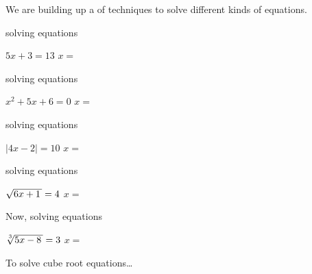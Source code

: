 \vfill 
We are building up a  of techniques to solve different kinds of equations.
\vspace{1\onelineskip}

\begin{tcbraster}[
    raster equal height, 
    raster columns = 2,
    raster column skip = 0.5in,
]
    \begin{tcolorbox}[colback=white,boxrule=0.5pt,]
        \raggedright
        {\small solving  equations \phantom{xxxxxxx}}
        \begin{center}
            \small
            $5x +3 = 13$
            \quad{\large$\Rightarrow$}\quad
            $x =$ 
        \end{center}
    \end{tcolorbox}
    \begin{tcolorbox}[colback=white,boxrule=0.5pt,]
        \raggedright
        {\small solving  equations}
        \begin{center}
            \small
            $x^2 + 5x + 6 = 0$
            \quad{\large$\Rightarrow$}\quad
            $x =$ 
        \end{center}
    \end{tcolorbox}
    \begin{tcolorbox}[colback=white,boxrule=0.5pt,]
        \raggedright
        {\small solving  equations}
        \begin{center}
            \small
            $|4x -2 | = 10$
            \quad{\large$\Rightarrow$}\quad
            $x =$ 
        \end{center}
    \end{tcolorbox}
    \begin{tcolorbox}[colback=white,boxrule=0.5pt,]
        \raggedright
        {\small solving  equations}
        \begin{center}
            \small
            $\myRoot{6x+1} = 4$
            \quad{\large$\Rightarrow$}\quad
            $x =$ 
        \end{center}
    \end{tcolorbox}
\end{tcbraster}

\begin{tcolorbox}[center,width=3.5in,colback=white,boxrule=0.5pt,]
    \raggedright
    {\small Now, solving  equations}
    \begin{center}
        \small
        $\myRoot[3]{5x-8} = 3$
        \quad{\large$\Rightarrow$}\quad
        $x =$ 
    \end{center}
\end{tcolorbox}


\vfill

\begin{myConceptSteps}{To solve cube root equations\dots}
\end{myConceptSteps}


\vfill
{}
